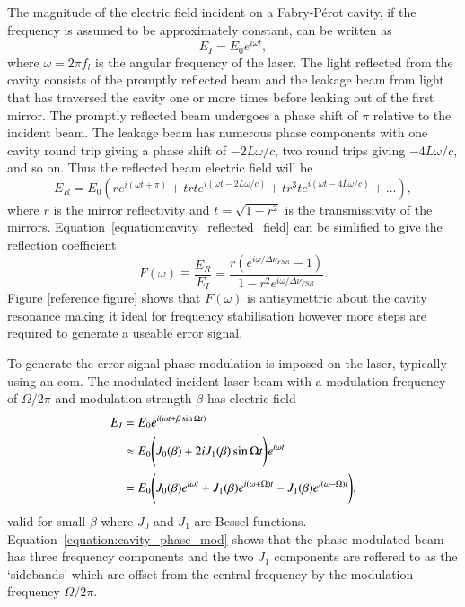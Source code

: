 The magnitude of the electric field incident on a Fabry-P\'erot cavity, if the frequency is assumed to be approximately constant, can be written as
\begin{equation}
E_{I} = E_0 e^{i\omega t},
\end{equation}
where $\omega=2\pi f_l$ is the angular frequency of the laser.
The light reflected from the cavity consists of the promptly reflected beam and the leakage beam from light that has traversed the cavity one or more times before leaking out of the first mirror.
The promptly reflected beam undergoes a phase shift of $\pi$ relative to the incident beam.
The leakage beam has numerous phase components with one cavity round trip giving a phase shift of $-2L\omega/c$, two round trips giving $-4L\omega/c$, and so on.
Thus the reflected beam electric field will be
\begin{equation}\label{equation:cavity_reflected_field}
E_R = E_0 \left( r e^{i\left(\omega t + \pi\right)} + t r t e^{i\left(\omega t -2L\omega/c\right)} + t r^3 t e^{i\left(\omega t -4L\omega/c\right)} + ...\right),
\end{equation}
where $r$ is the mirror reflectivity and $t=\sqrt{1-r^2}$ is the transmissivity of the mirrors.
Equation~\ref{equation:cavity_reflected_field} can be simlified to give the reflection coefficient
\begin{equation}
F(\omega) \equiv \frac{E_R}{E_I} = \frac{r\left(e^{i\omega / \Delta\nu_{FSR}} - 1 \right)}{1-r^2 e^{i\omega / \Delta\nu_{FSR}}}.
\end{equation}
Figure {\color{red}[reference figure]} shows that $F(\omega)$ is antisymettric about the cavity resonance making it ideal for frequency stabilisation however more steps are required to generate a useable error signal.

To generate the error signal phase modulation is imposed on the laser, typically using an \gls{eom}.
The modulated incident laser beam with a modulation frequency of $\Omega/2\pi$ and modulation strength $\beta$ has electric field
\begin{align}
E_I &= E_0 e^{i\left(\omega t + \beta \sin\Omega t \right)} \notag \\
&\approx E_0 \Bigg( J_0(\beta) + 2iJ_1(\beta)\sin\Omega t \Bigg)e^{i\omega t} \notag \\
&= E_0 \Bigg( J_0(\beta)e^{i\omega t} + J_1(\beta)e^{i(\omega + \Omega)t} - J_1(\beta)e^{i(\omega - \Omega)t} \Bigg),\label{equation:cavity_phase_mod}
\end{align}
valid for small $\beta$ where $J_0$ and $J_1$ are Bessel functions.
Equation~\ref{equation:cavity_phase_mod} shows that the phase modulated beam has three frequency components and the two $J_1$ components are reffered to as the `sidebands' which are offset from the central frequency by the modulation frequency $\Omega/2\pi$.

